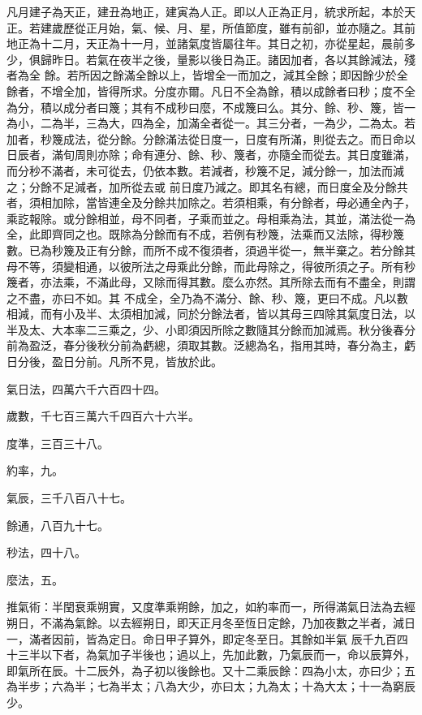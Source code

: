 \begin{pinyinscope}
 凡月建子為天正，建丑為地正，建寅為人正。即以人正為正月，統求所起，本於天正。若建歲歷從正月始，氣、候、月、星，所值節度，雖有前卻，並亦隨之。其前地正為十二月，天正為十一月，並諸氣度皆屬往年。其日之初，亦從星起，晨前多少，俱歸昨日。若氣在夜半之後，量影以後日為正。諸因加者，各以其餘減法，殘者為全
 餘。若所因之餘滿全餘以上，皆增全一而加之，減其全餘；即因餘少於全餘者，不增全加，皆得所求。分度亦爾。凡日不全為餘，積以成餘者曰秒；度不全為分，積以成分者曰篾；其有不成秒曰麼，不成篾曰么。其分、餘、秒、篾，皆一為小，二為半，三為大，四為全，加滿全者從一。其三分者，一為少，二為太。若加者，秒篾成法，從分餘。分餘滿法從日度一，日度有所滿，則從去之。而日命以日辰者，滿旬周則亦除；命有連分、餘、秒、篾者，亦隨全而從去。其日度雖滿，而分秒不滿者，未可從去，仍依本數。若減者，秒篾不足，減分餘一，加法而減之；分餘不足減者，加所從去或
 前日度乃減之。即其名有總，而日度全及分餘共者，須相加除，當皆連全及分餘共加除之。若須相乘，有分餘者，母必通全內子，乘訖報除。或分餘相並，母不同者，子乘而並之。母相乘為法，其並，滿法從一為全，此即齊同之也。既除為分餘而有不成，若例有秒篾，法乘而又法除，得秒篾數。已為秒篾及正有分餘，而所不成不復須者，須過半從一，無半棄之。若分餘其母不等，須變相通，以彼所法之母乘此分餘，而此母除之，得彼所須之子。所有秒篾者，亦法乘，不滿此母，又除而得其數。麼么亦然。其所除去而有不盡全，則謂之不盡，亦曰不如。其
 不成全，全乃為不滿分、餘、秒、篾，更曰不成。凡以數相減，而有小及半、太須相加減，同於分餘法者，皆以其母三四除其氣度日法，以半及太、大本率二三乘之，少、小即須因所除之數隨其分餘而加減焉。秋分後春分前為盈泛，春分後秋分前為虧總，須取其數。泛總為名，指用其時，春分為主，虧日分後，盈日分前。凡所不見，皆放於此。



 氣日法，四萬六千六百四十四。



 歲數，千七百三萬六千四百六十六半。



 度準，三百三十八。



 約率，九。



 氣辰，三千八百八十七。



 餘通，八百九十七。



 秒法，四十八。



 麼法，五。



 推氣術：半閏衰乘朔實，又度準乘朔餘，加之，如約率而一，所得滿氣日法為去經朔日，不滿為氣餘。以去經朔日，即天正月冬至恆日定餘，乃加夜數之半者，減日一，滿者因前，皆為定日。命日甲子算外，即定冬至日。其餘如半氣
 辰千九百四十三半以下者，為氣加子半後也；過以上，先加此數，乃氣辰而一，命以辰算外，即氣所在辰。十二辰外，為子初以後餘也。又十二乘辰餘：四為小太，亦曰少；五為半步；六為半；七為半太；八為大少，亦曰太；九為太；十為大太；十一為窮辰少。




\end{pinyinscope}
